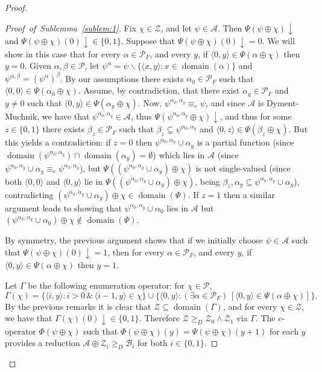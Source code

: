 \documentclass[11pt]{amsart}
\DeclareMathOperator{\dom}{domain}
\newcommand{\MP}[1]{\ensuremath{\mathcal{#1}}}
\newcommand{\QE}[1]{(\exists{#1})\,}
\begin{document}
\begin{proof}
\begin{proof}[Proof~of~Sublemma~\ref{sublem:1}]
Fix $\chi \in \MP{Z}$, and let $\psi \in \MP{A}$. Then $\Psi(\psi \oplus 
\chi)\downarrow$ and $\Psi(\psi \oplus \chi)(0) \downarrow \in \{0,1\}$. 
Suppose that $\Psi(\psi \oplus \chi)(0) \downarrow =0$. We will show in this 
case that for every $\alpha\in \MP{P}_F$, and every $y$, if $\langle 0, y 
\rangle \in \Psi(\alpha \oplus \chi)$ then $y=0$. Given $\alpha, \beta \in 
\MP{P}$, let $\psi^\alpha=\psi\smallsetminus \{\langle x,y \rangle: x \in 
\dom(\alpha)\}$ and $\psi^{\alpha,\beta}=(\psi^\alpha)^{\beta}$. By our 
assumptions there exists $\alpha_0\in \MP{P}_F$ such that $\langle 0, 0 
\rangle \in \Psi(\alpha_0 \oplus \chi)$. Assume, by contradiction, that there 
exist $\alpha_y\in \MP{P}_F$ and $y\ne 0$ such that $\langle 0,y\rangle \in 
\Psi(\alpha_y \oplus \chi)$. Now, $\psi^{\alpha_0, \alpha_y}\equiv_e \psi$, 
and since $\MP{A}$ is Dyment-Muchnik, we have that $\psi^{\alpha_0, 
\alpha_y}\in \MP{A}$, thus $\Psi(\psi^{\alpha_0, \alpha_y}\oplus 
\chi)\downarrow$, and thus for some $z\in \{0,1\}$ there exists $\beta_z \in 
\MP{P}_F$ such that $\beta_z \subseteq \psi^{\alpha_0, \alpha_y}$ and 
$\langle 0, z \rangle \in \Psi(\beta_z \oplus \chi)$. But this yields a 
contradiction: if $z=0$ then $\psi^{\alpha_0, \alpha_y} \cup \alpha_y$  is a 
partial function (since $\dom(\psi^{\alpha_0, \alpha_y}) \cap 
\dom(\alpha_y)=\emptyset$) which lies in $\MP{A}$ (since $\psi^{\alpha_0, 
\alpha_y} \cup \alpha_y\equiv_e \psi^{\alpha_0, \alpha_y}$), but 
$\Psi((\psi^{\alpha_0, \alpha_y} \cup \alpha_y)\oplus \chi)$ is not 
single-valued (since both $\langle 0, 0\rangle$ and $\langle 0, y\rangle$ lie 
in $\Psi((\psi^{\alpha_0, \alpha_y} \cup \alpha_y)\oplus \chi)$, being 
$\beta_z, \alpha_y \subseteq \psi^{\alpha_0, \alpha_y} \cup \alpha_y$), 
contradicting $(\psi^{\alpha_0, \alpha_y} \cup \alpha_y)\oplus \chi \in 
\dom(\Psi)$. If $z=1$ then a similar argument leads to showing that 
$\psi^{\alpha_0, \alpha_y} \cup \alpha_0$ lies in $\MP{A}$ but 
$(\psi^{\alpha_0, \alpha_y} \cup \alpha_0)\oplus \chi \notin \dom(\Psi)$. 

By symmetry, the previous argument shows that if we initially choose $\psi 
\in \MP{A}$ such that $\Psi(\psi \oplus \chi)(0) \downarrow =1$, then for 
every $\alpha\in \MP{P}_F$, and every $y$, if $\langle 0, y \rangle \in 
\Psi(\alpha \oplus \chi)$ then $y=1$. 

Let $\Gamma$ be the following enumeration operator: for $\chi \in 
\mathcal{P}$,  
\[
\Gamma(\chi) =\{\langle i, y\rangle: i>0 \,\&\,  
                \langle i-1,y\rangle \in \chi\} \cup 
\{\langle 0, y\rangle: \QE{\alpha \in \MP{P}_F}[\langle 0, y \rangle \in 
                \Psi(\alpha\oplus \chi)]\}.
\]
By the previous remarks it is clear that $\MP{Z} \subseteq \dom(\Gamma)$, and 
for every $\chi \in \mathcal{Z}$, we have that $\Gamma(\chi)(0)\downarrow \in 
\{0,1\}$. Therefore $\MP{Z} \geq_D \MP{Z}_0 \wedge \MP{Z}_1$ via $\Gamma$. 
The $e$-operator $\Phi(\psi \oplus \chi)$ such that $\Phi(\psi \oplus 
\chi)(y)=\Psi(\psi \oplus \chi)(y+1)$ for each $y$ provides a reduction 
$\MP A \oplus \MP{Z}_i \geq_D \MP{B}_i$ for both $i \in \{0,1\}$. 


\end{proof}
\end{proof}
\end{document}
